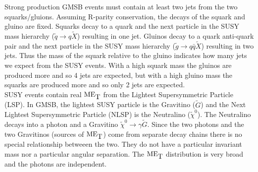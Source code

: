 Strong production GMSB events must contain at least two jets from the two
squarks/gluions. Assuming R-parity conservation, the decays of the squark and
gluino are fixed. Squarks decay to a quark and the next particle in the SUSY mass
hierarchy ($\tilde{q}\rightarrow q\tilde{X}$) resulting in one jet. Gluinos decay 
to a quark anti-quark pair and the next particle in the SUSY mass hierarchy
($\tilde{g}\rightarrow q\bar{q}\tilde{X}$) resulting in two jets. Thus the mass
of the squark relative to the gluino indicates how many jets we expect from the
SUSY events. With a high squark mass the gluinos are produced more and so 4 jets
are expected, but with a high gluino mass the squarks are produced more and so
only 2 jets are expected. \\

SUSY events contain real $\mbox{ME}_{\mbox{T}}$ from the Lightest Supersymmetric Particle (LSP).
In GMSB, the lightest SUSY particle is the Gravitino ($\tilde{G}$) and the Next
Lightest Supersymmetric Particle (NLSP) is the Neutralino ($\tilde{\chi}^{0}$).
The Neutralino decays into a photon and a Gravitino $\tilde{\chi}^{0}\rightarrow
\gamma\tilde{G}$. Since the two photons and the two Gravitinos (sources of 
$\mbox{ME}_{\mbox{T}}$) come from separate decay chains there is no special relationship
betweeen the two. They do not have a particular invariant mass nor a particular
angular separation. The $\mbox{ME}_{\mbox{T}}$ distribution is very broad and the photons are
independent.

